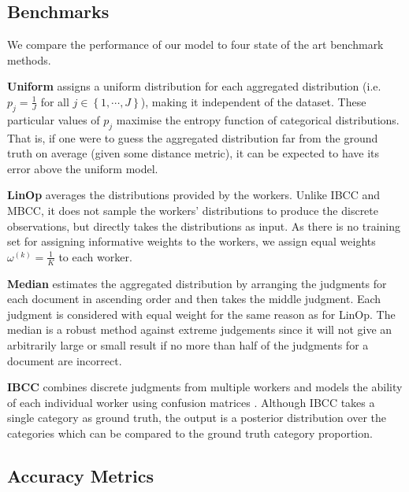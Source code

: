 \documentclass{article}
\begin{document}
\subsection{Benchmarks}

\label{sub:4.3-Benchmarks}

We compare the performance of our model to four state of the art
benchmark methods.

\textbf{Uniform }assigns a uniform distribution for each aggregated
distribution (i.e. $p_{j}=\frac{1}{J}$ for all $j\in\left\{ 1,\cdots,J\right\} $),
making it independent of the dataset. These particular values of
$p_{j}$ maximise the entropy function of categorical distributions.
That is, if one were to guess the aggregated distribution far from
the ground truth on average (given some distance metric), it can
be expected to have its error above the uniform model.  

\noindent \indent \textbf{LinOp }averages the distributions
provided by the workers. Unlike IBCC and MBCC, it does not sample
the workers' distributions to produce the discrete observations, but
directly takes the distributions as input.  As there is no training
set for assigning informative weights to the workers, we assign equal
weights $\omega^{(k)}=\frac{1}{K}$ to each worker.

\noindent \indent \textbf{Median }estimates the aggregated distribution
by arranging the judgments for each document in ascending order
and then takes the middle judgment. Each judgment is considered with
equal weight for the same reason as for LinOp. The median is a robust
method against extreme judgements since it will not give an arbitrarily
large or small result if no more than half of the judgments for a
document are incorrect.





\noindent  

\noindent \indent \textbf{IBCC}  combines discrete judgments
from multiple workers and models the ability of each individual worker
using confusion matrices \cite{kim_bayesian_2012}. Although IBCC
takes a single category as ground truth, the output is a posterior
distribution over the categories which can be compared to the ground
truth category proportion.

\noindent 


\subsection{Accuracy Metrics}
\end{document}

